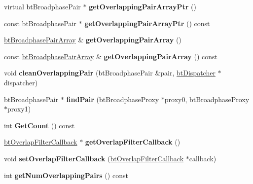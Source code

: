 \begin{DoxyCompactItemize}
virtual bt\+Broadphase\+Pair $\ast$ {\bfseries get\+Overlapping\+Pair\+Array\+Ptr} ()
\item 
\mbox{\label{classbtHashedOverlappingPairCache_a464066121648950c9545db98b20f78d4}} 
const bt\+Broadphase\+Pair $\ast$ {\bfseries get\+Overlapping\+Pair\+Array\+Ptr} () const
\item 
\mbox{\label{classbtHashedOverlappingPairCache_aaca68aaa41dacb5791fe90f7fc284e7c}} 
\hyperlink{classbtAlignedObjectArray}{bt\+Broadphase\+Pair\+Array} \& {\bfseries get\+Overlapping\+Pair\+Array} ()
\item 
\mbox{\label{classbtHashedOverlappingPairCache_ab36d65daeb34a0ab0e60504523841d2e}} 
const \hyperlink{classbtAlignedObjectArray}{bt\+Broadphase\+Pair\+Array} \& {\bfseries get\+Overlapping\+Pair\+Array} () const
\item 
\mbox{\label{classbtHashedOverlappingPairCache_a114297f90c75db7d8ab95b3a24084b6f}} 
void {\bfseries clean\+Overlapping\+Pair} (bt\+Broadphase\+Pair \&pair, \hyperlink{classbtDispatcher}{bt\+Dispatcher} $\ast$dispatcher)
\item 
\mbox{\label{classbtHashedOverlappingPairCache_a1b1c4d29d852efc2c47cf33a56115af0}} 
bt\+Broadphase\+Pair $\ast$ {\bfseries find\+Pair} (bt\+Broadphase\+Proxy $\ast$proxy0, bt\+Broadphase\+Proxy $\ast$proxy1)
\item 
\mbox{\label{classbtHashedOverlappingPairCache_aa3de79b309d27109e54749090a88336d}} 
int {\bfseries Get\+Count} () const
\item 
\mbox{\label{classbtHashedOverlappingPairCache_a423c20dadb90c50a5a889e4a649e35ff}} 
\hyperlink{structbtOverlapFilterCallback}{bt\+Overlap\+Filter\+Callback} $\ast$ {\bfseries get\+Overlap\+Filter\+Callback} ()
\item 
\mbox{\label{classbtHashedOverlappingPairCache_a9af1a20fd2d8c1d28423114760a72aa1}} 
void {\bfseries set\+Overlap\+Filter\+Callback} (\hyperlink{structbtOverlapFilterCallback}{bt\+Overlap\+Filter\+Callback} $\ast$callback)
\item 
\mbox{\label{classbtHashedOverlappingPairCache_ae82270949a717aa2c99920b423020459}} 
int {\bfseries get\+Num\+Overlapping\+Pairs} () const
\end{DoxyCompactItemize}
